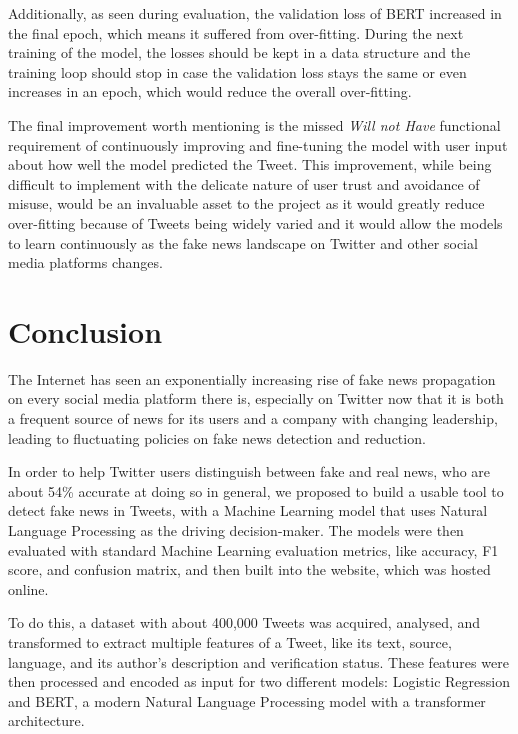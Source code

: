 \documentclass{l4proj}
\begin{document}
Additionally, as seen during evaluation, the validation loss of BERT increased in the final epoch, which means it suffered from over-fitting. During the next training of the model, the losses should be kept in a data structure and the training loop should stop in case the validation loss stays the same or even increases in an epoch, which would reduce the overall over-fitting.

The final improvement worth mentioning is the missed \textit{Will not Have} functional requirement of continuously improving and fine-tuning the model with user input about how well the model predicted the Tweet. This improvement, while being difficult to implement with the delicate nature of user trust and avoidance of misuse, would be an invaluable asset to the project as it would greatly reduce over-fitting because of Tweets being widely varied and it would allow the models to learn continuously as the fake news landscape on Twitter and other social media platforms changes.


\chapter{Conclusion}  
\label{chap:conclusion}

The Internet has seen an exponentially increasing rise of fake news propagation on every social media platform there is, especially on Twitter now that it is both a frequent source of news for its users and a company with changing leadership, leading to fluctuating policies on fake news detection and reduction.

In order to help Twitter users distinguish between fake and real news, who are about 54\% accurate at doing so in general, we proposed to build a usable tool to detect fake news in Tweets, with a Machine Learning model that uses Natural Language Processing as the driving decision-maker. The models were then evaluated with standard Machine Learning evaluation metrics, like accuracy, F1 score, and confusion matrix, and then built into the website, which was hosted online. 

To do this, a dataset with about 400,000 Tweets was acquired, analysed, and transformed to extract multiple features of a Tweet, like its text, source, language, and its author's description and verification status. These features were then processed and encoded as input for two different models: Logistic Regression and BERT, a modern Natural Language Processing model with a transformer architecture. 
\end{document}
